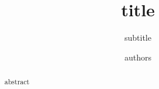 \documentclass[journal=tosc,preprint,spthm]{iacrtrans}
\author{authors}
\institute{institutions}
\title{title}
\subtitle{subtitle}
\begin{document}
\maketitle


\begin{abstract}
  abstract
\end{abstract}

\vfill
\tableofcontents
\newpage








\end{document}

